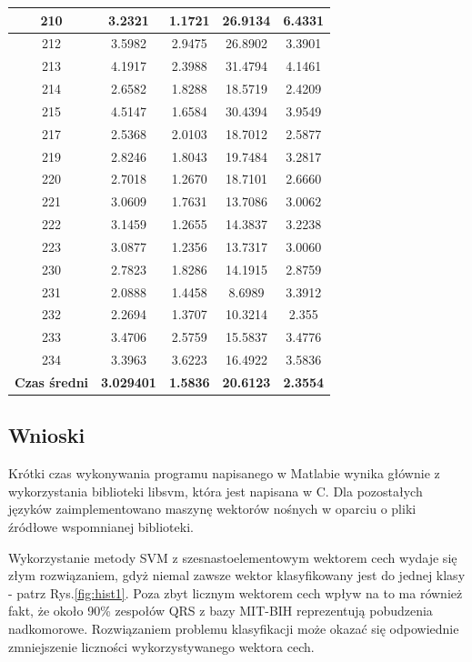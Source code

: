 \begin{table}[!tp]
\begin{tabular}{|c|c|c|c|c|}
		210 & 3.2321 & 1.1721 & 26.9134 & 6.4331\\ \hline
		212 & 3.5982 & 2.9475 & 26.8902 & 3.3901\\ \hline
		213 & 4.1917 & 2.3988 & 31.4794 & 4.1461\\ \hline
		214 & 2.6582 & 1.8288 & 18.5719 & 2.4209\\ \hline
		215 & 4.5147 & 1.6584 & 30.4394 & 3.9549\\ \hline
		217 & 2.5368 & 2.0103 & 18.7012 & 2.5877\\ \hline
		219 & 2.8246 & 1.8043 & 19.7484 & 3.2817\\ \hline
		220 & 2.7018 & 1.2670 & 18.7101 & 2.6660\\ \hline		
		221 & 3.0609 & 1.7631 & 13.7086 & 3.0062\\ \hline
		222 & 3.1459 & 1.2655 & 14.3837 & 3.2238\\ \hline
		223 & 3.0877 & 1.2356 & 13.7317 & 3.0060\\ \hline
		230 & 2.7823 & 1.8286 & 14.1915 & 2.8759\\ \hline
		231 & 2.0888 & 1.4458 &  8.6989 & 3.3912\\ \hline
		232 & 2.2694 & 1.3707 & 10.3214  & 2.355\\ \hline
		233 & 3.4706 & 2.5759 & 15.5837 & 3.4776\\ \hline
		234 & 3.3963 & 3.6223 & 16.4922 & 3.5836\\ \hline
		\textbf{Czas średni} & \textbf{3.029401} & \textbf{1.5836} & \textbf{20.6123} & \textbf{2.3554}\\ \hline
	\end{tabular}
\end{table}

\subsection{Wnioski}

Krótki czas wykonywania programu napisanego w Matlabie wynika głównie z wykorzystania biblioteki libsvm, która jest napisana w C. Dla pozostałych języków zaimplementowano maszynę wektorów nośnych w oparciu o pliki źródłowe wspomnianej biblioteki.

Wykorzystanie metody SVM z szesnastoelementowym wektorem cech wydaje się złym rozwiązaniem, gdyż niemal zawsze wektor klasyfikowany jest do jednej klasy - patrz Rys.\ref{fig:hist1}. Poza zbyt licznym wektorem cech wpływ na to ma również fakt, że około 90\% zespołów QRS z bazy MIT-BIH reprezentują pobudzenia nadkomorowe. Rozwiązaniem problemu klasyfikacji może okazać się odpowiednie zmniejszenie liczności wykorzystywanego wektora cech.


